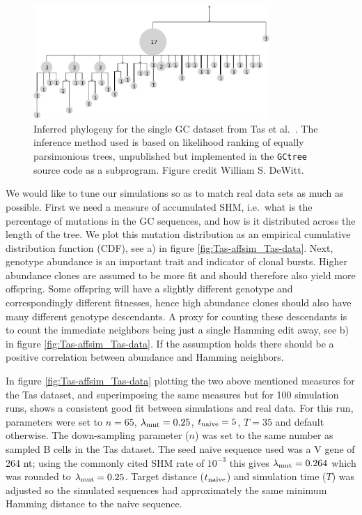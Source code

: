 \begin{figure}[!ht]
    \centering
    \includegraphics[width=0.8\textwidth]{figures/Tas_tree.pdf}
    \caption{
        \label{fig:Tas_tree}
        Inferred phylogeny for the single GC dataset from Tas et al.\ \cite{tas2016visualizing}.
        The inference method used is based on likelihood ranking of equally parsimonious trees, unpublished but implemented in the \texttt{GCtree} source code as a subprogram.
        Figure credit William S. DeWitt.
    }
\end{figure}

We would like to tune our simulations so as to match real data sets as much as possible.
First we need a measure of accumulated SHM, i.e.\ what is the percentage of mutations in the GC sequences, and how is it distributed across the length of the tree.
We plot this mutation distribution as an empirical cumulative distribution function (CDF), see a) in figure \ref{fig:Tas-affsim_Tas-data}.
Next, genotype abundance is an important trait and indicator of clonal bursts.
Higher abundance clones are assumed to be more fit and should therefore also yield more offspring.
Some offspring will have a slightly different genotype and correspondingly different fitnesses, hence high abundance clones should also have many different genotype descendants.
A proxy for counting these descendants is to count the immediate neighbors being just a single Hamming edit away, see b) in figure \ref{fig:Tas-affsim_Tas-data}.
If the assumption holds there should be a positive correlation between abundance and Hamming neighbors.

In figure \ref{fig:Tas-affsim_Tas-data} plotting the two above mentioned measures for the Tas dataset, and superimposing the same measures but for 100 simulation runs, shows a consistent good fit between simulations and real data.
For this run, parameters were set to $n=65$, $\lambda_{\text{mut}}=0.25$, $t_{\text{naive}}=5$, $T=35$ and default otherwise.
The down-sampling parameter ($n$) was set to the same number as sampled B cells in the Tas dataset.
The seed naive sequence used was a V gene of 264 nt; using the commonly cited SHM rate of $10^{-3}$ \cite{victora2012germinal} this gives $\lambda_{\text{mut}}=0.264$ which was rounded to $\lambda_{\text{mut}}=0.25$.
Target distance ($t_{\text{naive}}$) and simulation time ($T$) was adjusted so the simulated sequences had approximately the same minimum Hamming distance to the naive sequence.

